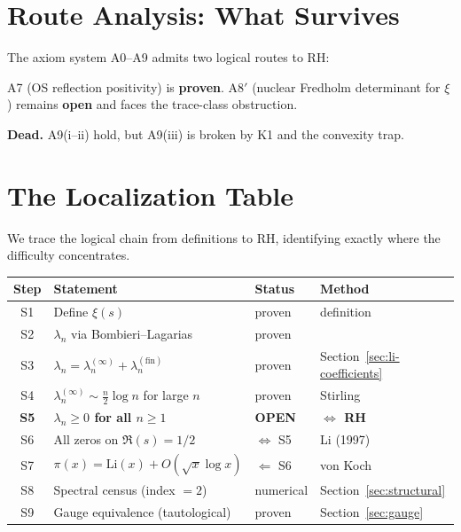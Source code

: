 \documentclass[12pt,a4paper]{article}
\theoremstyle{definition}
\theoremstyle{remark}
\begin{document}
\section{Route Analysis: What Survives}
\label{sec:routes}

The axiom system A0--A9 admits two logical routes to RH:

\begin{description}[font=\bfseries,leftmargin=2em]
  \item[Route 1 (A7 + A8$'$):] A7 (OS reflection positivity) is \textbf{proven}. A8$'$ (nuclear Fredholm determinant for $\xi$) remains \textbf{open} and faces the trace-class obstruction.
  \item[Route 2 (A9):] \textbf{Dead.} A9(i--ii) hold, but A9(iii) is broken by K1 and the convexity trap.
\end{description}


\section{The Localization Table}
\label{sec:localization}

We trace the logical chain from definitions to RH, identifying exactly where the difficulty concentrates.

\begin{center}
\renewcommand{\arraystretch}{1.2}
\begin{tabular}{c|l|l|l}
\textbf{Step} & \textbf{Statement} & \textbf{Status} & \textbf{Method} \\\hline
S1 & Define $\xi(s)$ & proven & definition \\
S2 & $\lambda_n$ via Bombieri--Lagarias & proven & \cite{BombieriLagarias1999} \\
S3 & $\lambda_n = \lambda_n^{(\infty)} + \lambda_n^{(\mathrm{fin})}$ & proven & Section~\ref{sec:li-coefficients} \\
S4 & $\lambda_n^{(\infty)} \sim \frac{n}{2}\log n$ for large $n$ & proven & Stirling \\
\textbf{S5} & \textbf{$\lambda_n \geq 0$ for all $n \geq 1$} & \textbf{OPEN} & \textbf{$\Longleftrightarrow$ RH} \\
S6 & All zeros on $\Re(s) = 1/2$ & $\Leftrightarrow$ S5 & Li (1997) \\
S7 & $\pi(x) = \mathrm{Li}(x) + O(\sqrt{x}\log x)$ & $\Leftarrow$ S6 & von Koch \\
S8 & Spectral census (index $= 2$) & numerical & Section~\ref{sec:structural} \\
S9 & Gauge equivalence (tautological) & proven & Section~\ref{sec:gauge} \\
\end{tabular}
\end{center}
\end{document}
